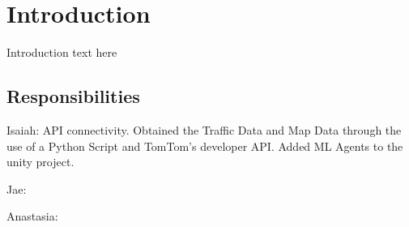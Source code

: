 \section{Introduction}

Introduction text here

\subsection{Responsibilities}

Isaiah: API connectivity.
Obtained the Traffic Data and Map Data through the use of a Python Script and TomTom's developer API.
Added ML Agents to the unity project.

Jae: 

Anastasia: 